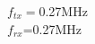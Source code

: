 \documentclass[preview]{standalone}
\begin{document}
\begin{center}
$f_{tx}=$0.27MHz\\$f_{rx}$=0.27MHz
\end{center}
\end{document}
